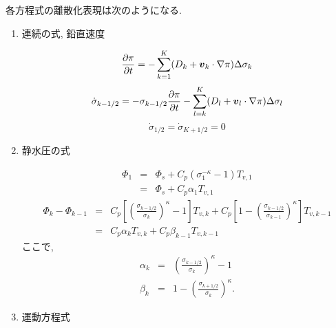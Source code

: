 各方程式の離散化表現は次のようになる.

\begin{enumerate}
\item 連続の式, 鉛直速度

\begin{equation}
  \frac{\partial \pi}{\partial t}
 = - \sum_{k=1}^{K} ( D_k + \Dvect{v}_k \cdot \nabla \pi ) 
       \Delta  \sigma_k
\end{equation}
%
\begin{equation}
  \dot{\sigma}_{k-1/2}
 = - \sigma_{k-1/2} \frac{\partial \pi}{\partial t}
   - \sum_{l=k}^{K} ( D_l + \Dvect{v}_l \cdot \nabla \pi )          
       \Delta  \sigma_l
\end{equation}
%
\begin{equation}
  \dot{\sigma}_{1/2} = \dot{\sigma}_{K+1/2} = 0
\end{equation}
   
\item 静水圧の式

\begin{eqnarray}
 \Phi_{1} & = & \Phi_{s} + C_{p} ( \sigma_{1}^{-\kappa} - 1  ) T_{v,1} \\
          & = & \Phi_{s} + C_{p} \alpha_{1} T_{v,1} \nonumber
\end{eqnarray}
%
\begin{eqnarray}
 \Phi_k - \Phi_{k-1} 
  & = & C_{p}
   \left[ \left( \frac{ \sigma_{k-1/2} }{ \sigma_k } \right)^{\kappa}
          - 1 \right] T_{v,k} 
       + C_{p}
   \left[ 1- 
         \left( \frac{ \sigma_{k-1/2} }{ \sigma_{k-1} } \right)^{\kappa}
              \right] T_{v,k-1} \\
  & =  &  C_{p} \alpha_k T_{v,k} + C_{p} \beta_{k-1} T_{v,k-1}
               \nonumber
\end{eqnarray}
%
ここで,
%
\begin{eqnarray}
 \label{静水圧係数}
 \alpha_k  & = & \left( \frac{ \sigma_{k-1/2} }
                               { \sigma_k } \right)^{\kappa} -1 \\
 \beta_k   & = & 1- \left( \frac{ \sigma_{k+1/2} }
                               { \sigma_k } \right)^{\kappa} .
\end{eqnarray}

\item 運動方程式


\end{enumerate}
